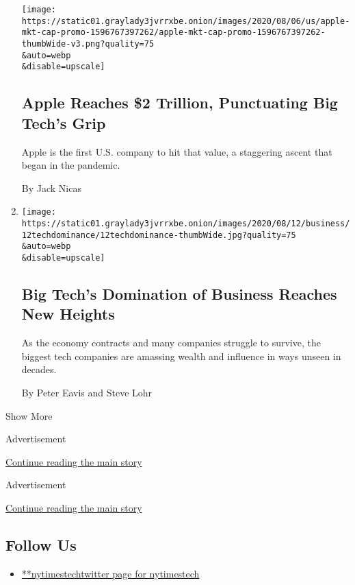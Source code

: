 \begin{enumerate}
  \texttt{[image: https://static01.graylady3jvrrxbe.onion/images/2020/08/06/us/apple-mkt-cap-promo-1596767397262/apple-mkt-cap-promo-1596767397262-thumbWide-v3.png?quality=75\\\&auto=webp\\\&disable=upscale]}

  \hypertarget{apple-reaches-2-trillion-punctuating-big-techs-grip}{%
  \subsection{Apple Reaches \$2 Trillion, Punctuating Big Tech's
  Grip}\label{apple-reaches-2-trillion-punctuating-big-techs-grip}}

  Apple is the first U.S. company to hit that value, a staggering ascent
  that began in the pandemic.

  By Jack Nicas
\item
  \href{/2020/08/19/technology/big-tech-business-domination.html}{}

  \texttt{[image: https://static01.graylady3jvrrxbe.onion/images/2020/08/12/business/12techdominance/12techdominance-thumbWide.jpg?quality=75\\\&auto=webp\\\&disable=upscale]}

  \hypertarget{big-techs-domination-of-business-reaches-new-heights}{%
  \subsection{Big Tech's Domination of Business Reaches New
  Heights}\label{big-techs-domination-of-business-reaches-new-heights}}

  As the economy contracts and many companies struggle to survive, the
  biggest tech companies are amassing wealth and influence in ways
  unseen in decades.

  By Peter Eavis and Steve Lohr
\end{enumerate}

Show More

Advertisement

\protect\hyperlink{after-mid2}{Continue reading the main story}

Advertisement

\protect\hyperlink{after-mktg}{Continue reading the main story}

\hypertarget{follow-us}{%
\subsection{Follow Us}\label{follow-us}}

\begin{itemize}
\tightlist
\item
  \href{https://twitter.com/nytimestech}{**nytimestechtwitter page for
  nytimestech}
\end{itemize}

